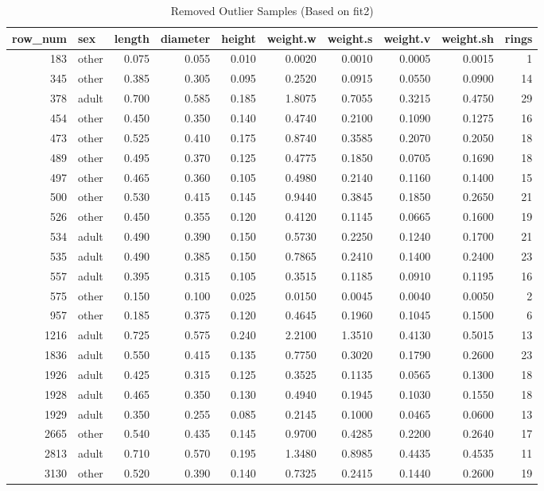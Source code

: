 \documentclass[12pt]{article}
\begin{document}
	\begin{table}[!h]
		\centering
		\caption{\label{tab:remove_influential}Removed Outlier Samples (Based on fit2)}
		\begin{tabular}{r l r r r r r r r r}
			\toprule
			row\_num & sex & length & diameter & height & weight.w & weight.s & weight.v & weight.sh & rings\\
			\midrule
			183  & other & 0.075 & 0.055 & 0.010 & 0.0020 & 0.0010 & 0.0005 & 0.0015 & 1\\
			345  & other & 0.385 & 0.305 & 0.095 & 0.2520 & 0.0915 & 0.0550 & 0.0900 & 14\\
			378  & adult & 0.700 & 0.585 & 0.185 & 1.8075 & 0.7055 & 0.3215 & 0.4750 & 29\\
			454  & other & 0.450 & 0.350 & 0.140 & 0.4740 & 0.2100 & 0.1090 & 0.1275 & 16\\
			473  & other & 0.525 & 0.410 & 0.175 & 0.8740 & 0.3585 & 0.2070 & 0.2050 & 18\\
			489  & other & 0.495 & 0.370 & 0.125 & 0.4775 & 0.1850 & 0.0705 & 0.1690 & 18\\
			497  & other & 0.465 & 0.360 & 0.105 & 0.4980 & 0.2140 & 0.1160 & 0.1400 & 15\\
			500  & other & 0.530 & 0.415 & 0.145 & 0.9440 & 0.3845 & 0.1850 & 0.2650 & 21\\
			526  & other & 0.450 & 0.355 & 0.120 & 0.4120 & 0.1145 & 0.0665 & 0.1600 & 19\\
			534  & adult & 0.490 & 0.390 & 0.150 & 0.5730 & 0.2250 & 0.1240 & 0.1700 & 21\\
			535  & adult & 0.490 & 0.385 & 0.150 & 0.7865 & 0.2410 & 0.1400 & 0.2400 & 23\\
			557  & adult & 0.395 & 0.315 & 0.105 & 0.3515 & 0.1185 & 0.0910 & 0.1195 & 16\\
			575  & other & 0.150 & 0.100 & 0.025 & 0.0150 & 0.0045 & 0.0040 & 0.0050 & 2\\
			957  & other & 0.185 & 0.375 & 0.120 & 0.4645 & 0.1960 & 0.1045 & 0.1500 & 6\\
			1216 & adult & 0.725 & 0.575 & 0.240 & 2.2100 & 1.3510 & 0.4130 & 0.5015 & 13\\
			1836 & adult & 0.550 & 0.415 & 0.135 & 0.7750 & 0.3020 & 0.1790 & 0.2600 & 23\\
			1926 & adult & 0.425 & 0.315 & 0.125 & 0.3525 & 0.1135 & 0.0565 & 0.1300 & 18\\
			1928 & adult & 0.465 & 0.350 & 0.130 & 0.4940 & 0.1945 & 0.1030 & 0.1550 & 18\\
			1929 & adult & 0.350 & 0.255 & 0.085 & 0.2145 & 0.1000 & 0.0465 & 0.0600 & 13\\
			2665 & other & 0.540 & 0.435 & 0.145 & 0.9700 & 0.4285 & 0.2200 & 0.2640 & 17\\
			2813 & adult & 0.710 & 0.570 & 0.195 & 1.3480 & 0.8985 & 0.4435 & 0.4535 & 11\\
			3130 & other & 0.520 & 0.390 & 0.140 & 0.7325 & 0.2415 & 0.1440 & 0.2600 & 19\\
			\bottomrule
		\end{tabular}
	\end{table}
	
\end{document}

